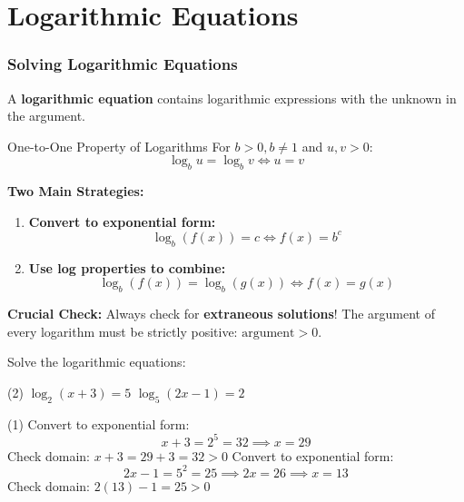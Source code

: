 \section[Equations]{Logarithmic Equations}
\frame{\sectionpage}

\begin{frame}[t]
  \frametitle{Solving Logarithmic Equations}
  A \textbf{logarithmic equation} contains logarithmic expressions with the unknown in the argument.
  \begin{thm}{One-to-One Property of Logarithms}{}
    For $b > 0, b \neq 1$ and $u, v > 0$:
    \[ \log_b u = \log_b v \iff u = v \]
  \end{thm}
  \begin{slide}
    \textbf{Two Main Strategies:}
    \begin{enumerate}
      \item \textbf{Convert to exponential form:}
      \[ \log_b (f(x)) = c \iff f(x) = b^c \]
      \item \textbf{Use log properties to combine:}
      \[ \log_b (f(x)) = \log_b (g(x)) \iff f(x) = g(x) \]
    \end{enumerate}
    \alert{\textbf{Crucial Check:}} Always check for \textbf{extraneous solutions}! The argument of every logarithm must be strictly positive: $\text{argument} > 0$.
  \end{slide}
\end{frame}

\begin{frame}[t]
  \begin{ex}
    Solve the logarithmic equations:
    \begin{tasks}(2)
      \task $\log_2 (x+3) = 5$
      \task $\log_5 (2x-1) = 2$
    \end{tasks}
  \end{ex}
  \begin{sol}
    \begin{tasks}(1)
      \task Convert to exponential form:
      \[ x+3 = 2^5 = 32 \implies x = 29 \]
      Check domain: $x+3 = 29+3 = 32 > 0$ \checkmark
      \task Convert to exponential form:
      \[ 2x-1 = 5^2 = 25 \implies 2x = 26 \implies x = 13 \]
      Check domain: $2(13)-1 = 25 > 0$ \checkmark
    \end{tasks}
  \end{sol}
\end{frame}

